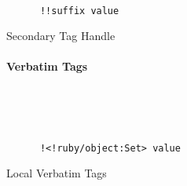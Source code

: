 \documentclass[a4paper, svgnames, 12pt]{article}
\begin{document}
\begin{figure}[H]
  \begin{minipage}[t]{0.48\textwidth}
    \vspace{0pt}
    \begin{bchart}[max=9, width=0.85\textwidth]
    \end{bchart}
  \end{minipage}
  \begin{minipage}[t]{0pt}~\end{minipage}
  \begin{minipage}[t]{0.48\textwidth}
    \vspace{0pt}
    \begin{verbatim}
      !!suffix value
    \end{verbatim}
  \end{minipage}
  \caption{Secondary Tag Handle}
\end{figure}

\begin{figure}[H]
\paragraph{Verbatim Tags}~\\
  \begin{minipage}[t]{0.48\textwidth}
    \vspace{0pt}
    \begin{bchart}[max=9, width=0.85\textwidth]
    \end{bchart}
  \end{minipage}
  \begin{minipage}[t]{0pt}~\end{minipage}
  \begin{minipage}[t]{0.48\textwidth}
    \vspace{0pt}
    \begin{verbatim}
      !<!ruby/object:Set> value
    \end{verbatim}
  \end{minipage}
  \caption{Local Verbatim Tags}
\end{figure}
\end{document}
